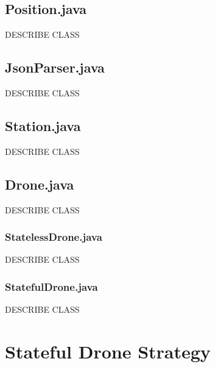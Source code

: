\documentclass{article}
\begin{document}
\subsection{Position.java}
\label{Position.java}
\begin{description}
DESCRIBE CLASS
\end{description} 

\subsection{JsonParser.java}
\label{JsonParser.java}
\begin{description}
DESCRIBE CLASS
\end{description} 

\subsection{Station.java}
\label{Station.java}
\begin{description}
DESCRIBE CLASS
\end{description} 

\subsection{Drone.java}
\label{Drone.java}
\begin{description}
DESCRIBE CLASS
\end{description} 

\subsubsection{StatelessDrone.java}
\label{StatelessDrone.java}
\begin{description}
DESCRIBE CLASS
\end{description} 

\subsubsection{StatefulDrone.java}
\label{StatefulDrone.java}
\begin{description}
DESCRIBE CLASS
\end{description} 
\pagebreak

\section{Stateful Drone Strategy}
\end{document}
